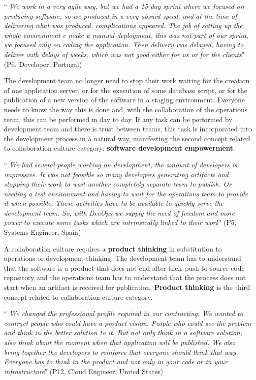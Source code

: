 \begin{mq}
``\emph{
We work in a very agile way, but we had a 15-day sprint where we focused on
producing software, so we produced in a very absurd speed, and at the time of
delivering what was produced, complications appeared. The job of setting up
the whole environment e make a manual deployment, this was not part of our
sprint, we focused only on coding the application. Then delivery was delayed,
having to deliver with delays of weeks, which was not good either for us or for
the clients}" (P6, Developer, Portugal)
\end{mq}

The development team no longer need to stop their work waiting for the creation
of one application server, or for the execution of some database script, or for
the publication of a new version of the software in a staging environment.
Everyone needs to know the way this is done and, with the collaboration of the
operations team, this can be performed in day to day. If any task can be
performed by development team and there is trust between teams, this task is
incorporated into the development process in a natural way, manifesting the
second concept related to collaboration culture category: \textbf{software
development empowerment}.

\begin{mq}
``\emph{
We had several people working on development, the amount of developers is
impressive. It was not feasible so many developers generating artifacts and
stopping their work to wait another completely separate team to publish. Or
needing a test environment and having to wait for the operations team to
provide it when possible. These activities have to be available to quickly
serve the development team. So, with DevOps we supply the need of freedom and
more power to execute some tasks which are intrinsically linked to their work}"
(P5, Systems Engineer, Spain)
\end{mq}

A collaboration culture requires a \textbf{product thinking} in substitution to
operations or development thinking. The development team has to understand that
the software is a product that does not end after their push to source code
repository and the operations team has to understand that the process does not
start when an artifact is received for publication. \textbf{Product thinking}
is the third concept related to collaboration culture category.

\begin{mq}
``\emph{
We changed the professional profile required in our contracting. We wanted to
contract people who could have a product vision. People who could see the
problem and think in the better solution to it. But not only think in a
software solution, also think about the moment when that application will be
published. We also bring together the developers to reinforce that everyone
should think that way. Everyone has to think in the product and not only in
your code or in your infrastructure}" (P12, Cloud Engineer, United States)
\end{mq}

